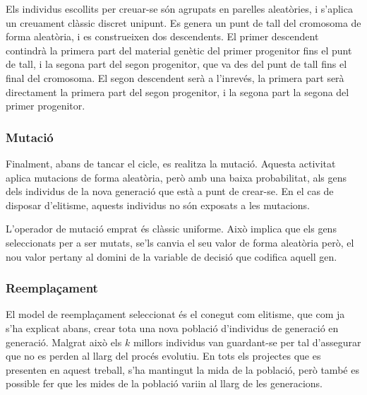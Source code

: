 \documentclass[titlepage,a4paper,12pt]{book}
\begin{document}
Els individus escollits per creuar-se són agrupats en parelles aleatòries, i
s'aplica un creuament clàssic discret unipunt.  Es genera un punt de tall del
cromosoma de forma aleatòria, i es construeixen dos descendents. El primer
descendent contindrà la primera part del material genètic del primer progenitor
fins el punt de tall, i la segona part del segon progenitor, que va des del punt
de tall fins el final del cromosoma. El segon descendent serà a l'inrevés, la
primera part serà directament la primera part del segon progenitor, i la segona
part la segona del primer progenitor.

\subsubsection{Mutació}

Finalment, abans de tancar el cicle, es realitza la mutació. Aquesta activitat
aplica mutacions de forma aleatòria, però amb una baixa probabilitat, als gens
dels individus de la nova generació que està a punt de crear-se. En el cas de
disposar d'elitisme, aquests individus no són exposats a les mutacions.

L'operador de mutació emprat és clàssic uniforme. Això implica que els gens
seleccionats per a ser mutats, se'ls canvia el seu valor de forma aleatòria
però, el nou valor pertany al domini de la variable de decisió que codifica
aquell gen.

\subsubsection{Reemplaçament}

El model de reemplaçament seleccionat és el conegut com elitisme, que com ja
s'ha explicat abans, crear tota una nova població d'individus de generació en
generació. Malgrat això els $k$ millors individus van guardant-se per tal
d'assegurar que no es perden al llarg del procés evolutiu.  En tots els
projectes que es presenten en aquest treball, s'ha mantingut la mida de la
població, però també es possible fer que les mides de la població variin al
llarg de les generacions.


\end{document}
